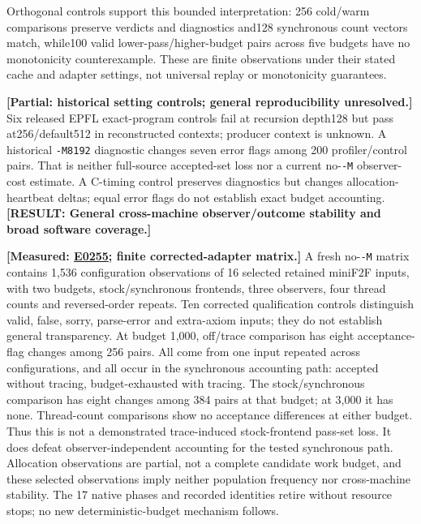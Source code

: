 \documentclass[10pt,twocolumn]{article}
\newcommand{\missing}[1]{\textbf{[RESULT: #1]}}
\newcommand{\measured}[1]{\textbf{[Measured: #1]}}
\newcommand{\partialev}[1]{\textbf{[Partial: #1]}}
\newcommand{\expref}[2]{\href{https://github.com/yunwei37/proofserve/blob/main/docs/tmp/build-and-evaluate/step-#1/step-report.md}{E#2}}
\begin{document}
Orthogonal controls support this bounded interpretation:
256 cold/warm comparisons preserve verdicts and diagnostics and128 synchronous
count vectors match, while100 valid lower-pass/higher-budget pairs across
five budgets have no monotonicity counterexample.
These are finite observations under their stated cache and adapter settings,
not universal replay or monotonicity guarantees.

\partialev{historical setting controls; general reproducibility unresolved.}
Six released EPFL exact-program controls fail at recursion depth128 but
pass at256/default512 in reconstructed contexts; producer context is unknown.
A historical \texttt{-M8192} diagnostic changes seven error flags among
200 profiler/control pairs.
That is neither full-source accepted-set loss nor a current no-\texttt{-M}
observer-cost estimate.
A C-timing control preserves diagnostics but changes allocation-heartbeat
deltas; equal error flags do not establish exact budget accounting.
\missing{General cross-machine observer/outcome stability and broad software coverage.}

\measured{\expref{0255-20261101T200059+0000}{0255};
finite corrected-adapter matrix.}
A fresh no-\texttt{-M} matrix contains 1,536 configuration observations of
16 selected retained miniF2F inputs, with two budgets, stock/synchronous
frontends, three observers, four thread counts and reversed-order repeats.
Ten corrected qualification controls distinguish valid, false, sorry,
parse-error and extra-axiom inputs; they do not establish general transparency.
At budget 1,000, off/trace comparison has eight acceptance-flag changes
among 256 pairs. All come from one input repeated across configurations,
and all occur in the synchronous accounting path: accepted without tracing,
budget-exhausted with tracing.
The stock/synchronous comparison has eight changes among 384 pairs at
that budget; at 3,000 it has none.
Thread-count comparisons show no acceptance differences at either budget.
Thus this is not a demonstrated trace-induced stock-frontend pass-set loss.
It does defeat observer-independent accounting for the tested synchronous
path. Allocation observations are partial, not a complete candidate work
budget, and these selected observations imply neither population frequency
nor cross-machine stability. The 17 native phases and recorded identities
retire without resource stops; no new deterministic-budget mechanism follows.
\end{document}
